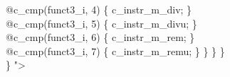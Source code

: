 {\indent \hspace{\parindent} \hspace{\parindent} @c\_cmp(funct3\_i, 4) \{ c\_instr\_m\_div; \}\\%
\indent \hspace{\parindent} \hspace{\parindent} @c\_cmp(funct3\_i, 5) \{ c\_instr\_m\_divu; \}\\%
\indent \hspace{\parindent} \hspace{\parindent} @c\_cmp(funct3\_i, 6) \{ c\_instr\_m\_rem; \}\\%
\indent \hspace{\parindent} \hspace{\parindent} @c\_cmp(funct3\_i, 7) \{ c\_instr\_m\_remu; \} \} \} \}\\%
\} "\textgreater\\%
}


